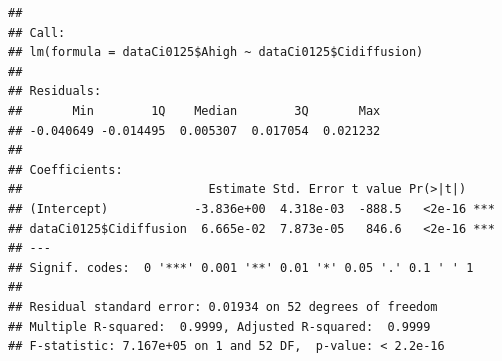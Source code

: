 \documentclass[
]{krantz}
\makeatletter
\newenvironment{Shaded}{\begin{snugshade}}{\end{snugshade}}
\newcommand{\CommentTok}[1]{\textcolor[rgb]{0.56,0.35,0.01}{\textit{#1}}}
\newcommand{\DecValTok}[1]{\textcolor[rgb]{0.00,0.00,0.81}{#1}}
\newcommand{\KeywordTok}[1]{\textcolor[rgb]{0.13,0.29,0.53}{\textbf{#1}}}
\newcommand{\NormalTok}[1]{#1}
\newcommand{\OperatorTok}[1]{\textcolor[rgb]{0.81,0.36,0.00}{\textbf{#1}}}
\newcommand{\StringTok}[1]{\textcolor[rgb]{0.31,0.60,0.02}{#1}}
\newenvironment{kframe}{%
\medskip{}
\setlength{\fboxsep}{.8em}
 \def\at@end@of@kframe{}%
 \ifinner\ifhmode%
  \def\at@end@of@kframe{\end{minipage}}%
  \begin{minipage}{\columnwidth}%
 \fi\fi%
 \def\FrameCommand##1{\hskip\@totalleftmargin \hskip-\fboxsep
 \colorbox{shadecolor}{##1}\hskip-\fboxsep
     \hskip-\linewidth \hskip-\@totalleftmargin \hskip\columnwidth}%
 \MakeFramed {\advance\hsize-\width
   \@totalleftmargin\z@ \linewidth\hsize
   \@setminipage}}%
 {\par\unskip\endMakeFramed%
 \at@end@of@kframe}
\renewenvironment{Shaded}{\begin{kframe}}{\end{kframe}}
\makeatother
\begin{document}
\begin{Shaded}
\end{Shaded}

\begin{verbatim}
## 
## Call:
## lm(formula = dataCi0125$Ahigh ~ dataCi0125$Cidiffusion)
## 
## Residuals:
##       Min        1Q    Median        3Q       Max 
## -0.040649 -0.014495  0.005307  0.017054  0.021232 
## 
## Coefficients:
##                          Estimate Std. Error t value Pr(>|t|)    
## (Intercept)            -3.836e+00  4.318e-03  -888.5   <2e-16 ***
## dataCi0125$Cidiffusion  6.665e-02  7.873e-05   846.6   <2e-16 ***
## ---
## Signif. codes:  0 '***' 0.001 '**' 0.01 '*' 0.05 '.' 0.1 ' ' 1
## 
## Residual standard error: 0.01934 on 52 degrees of freedom
## Multiple R-squared:  0.9999,	Adjusted R-squared:  0.9999 
## F-statistic: 7.167e+05 on 1 and 52 DF,  p-value: < 2.2e-16
\end{verbatim}
\end{document}
